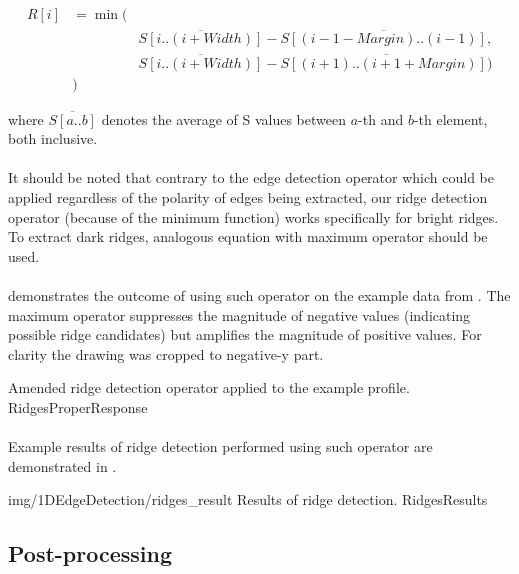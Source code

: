 \begin{eqnarray*}
R[i] & = \min( & \\
	& & \overline{S[i..(i+Width)]}-\overline{S[(i-1-Margin)..(i-1)]}, \\
	& & \overline{S[i..(i+Width)]}-\overline{S[(i+1)..(i+1+Margin)])} \\
	& ) &
\end{eqnarray*}

where $\overline{S[a..b]}$ denotes the average of S values between $a$-th and $b$-th element, both inclusive.

\paragraph*{}
It should be noted that contrary to the edge detection operator which could be applied regardless of the polarity of edges being extracted, our ridge detection operator (because of the minimum function) works specifically for bright ridges. To extract dark ridges, analogous equation with maximum operator should be used.

\paragraph*{}
 demonstrates the outcome of using such operator on the example data from . The maximum operator suppresses the magnitude of negative values (indicating possible ridge candidates) but amplifies the magnitude of positive values. For clarity the drawing was cropped to negative-y part.

\profileFigure
{
}
{Amended ridge detection operator applied to the example profile.}
{RidgesProperResponse}

\paragraph*{}
Example results of ridge detection performed using such operator are demonstrated in .

\oneFigure
{img/1DEdgeDetection/ridges_result}
{Results of ridge detection.}
{RidgesResults}
{\basicWidth}

\subsection{Post-processing}

